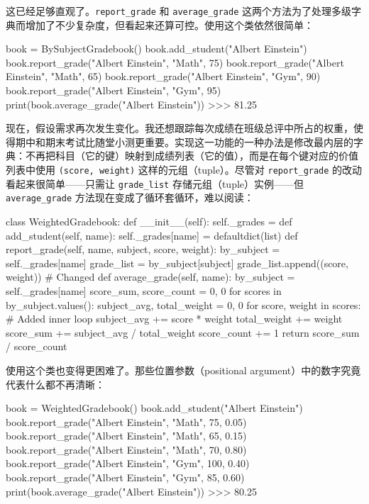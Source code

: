 这已经足够直观了。\texttt{report\_grade} 和 \texttt{average\_grade} 这两个方法为了处理多级字典而增加了不少复杂度，但看起来还算可控。使用这个类依然很简单：

\begin{codebox}[python]
book = BySubjectGradebook()
book.add_student("Albert Einstein")
book.report_grade("Albert Einstein", "Math", 75)
book.report_grade("Albert Einstein", "Math", 65)
book.report_grade("Albert Einstein", "Gym", 90)
book.report_grade("Albert Einstein", "Gym", 95)
print(book.average_grade("Albert Einstein"))
>>>
81.25
\end{codebox}

现在，假设需求再次发生变化。我还想跟踪每次成绩在班级总评中所占的权重，使得期中和期末考试比随堂小测更重要。实现这一功能的一种办法是修改最内层的字典：不再把科目（它的键）映射到成绩列表（它的值），而是在每个键对应的价值列表中使用 \texttt{(score, weight)} 这样的元组（tuple）。尽管对 \texttt{report\_grade} 的改动看起来很简单——只需让 \texttt{grade\_list} 存储元组（tuple）实例——但 \texttt{average\_grade} 方法现在变成了循环套循环，难以阅读：

\begin{codebox}[python]
class WeightedGradebook:
    def __init__(self):
        self._grades = {}
    def add_student(self, name):
        self._grades[name] = defaultdict(list)
    def report_grade(self, name, subject, score, weight):
        by_subject = self._grades[name]
        grade_list = by_subject[subject]
        grade_list.append((score, weight))    # Changed
    def average_grade(self, name):
        by_subject = self._grades[name]
        score_sum, score_count = 0, 0
        for scores in by_subject.values():
            subject_avg, total_weight = 0, 0
            for score, weight in scores:      # Added inner loop
                subject_avg += score * weight
                total_weight += weight
            score_sum += subject_avg / total_weight
            score_count += 1
        return score_sum / score_count
\end{codebox}

使用这个类也变得更困难了。那些位置参数（positional argument）中的数字究竟代表什么都不再清晰：

\begin{codebox}[python]
book = WeightedGradebook()
book.add_student("Albert Einstein")
book.report_grade("Albert Einstein", "Math", 75, 0.05)
book.report_grade("Albert Einstein", "Math", 65, 0.15)
book.report_grade("Albert Einstein", "Math", 70, 0.80)
book.report_grade("Albert Einstein", "Gym", 100, 0.40)
book.report_grade("Albert Einstein", "Gym", 85, 0.60)
print(book.average_grade("Albert Einstein"))
>>>
80.25
\end{codebox}

